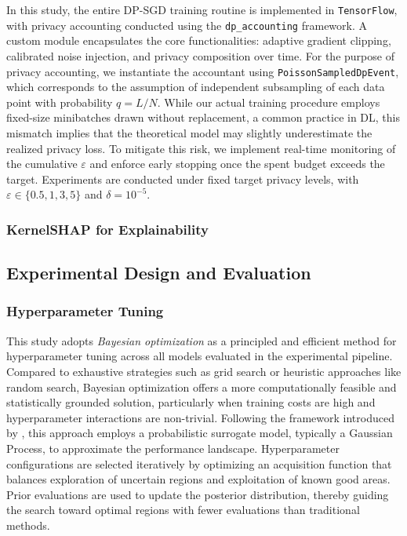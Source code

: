 In this study, the entire DP-SGD training routine is implemented in \texttt{TensorFlow}, with privacy accounting conducted using the \texttt{dp\_accounting} framework. A custom module encapsulates the core functionalities: adaptive gradient clipping, calibrated noise injection, and privacy composition over time. For the purpose of privacy accounting, we instantiate the accountant using \texttt{PoissonSampledDpEvent}, which corresponds to the assumption of independent subsampling of each data point with probability $q = L/N$. While our actual training procedure employs fixed-size minibatches drawn without replacement, a common practice in DL, this mismatch implies that the theoretical model may slightly underestimate the realized privacy loss. To mitigate this risk, we implement real-time monitoring of the cumulative $\varepsilon$ and enforce early stopping once the spent budget exceeds the target. Experiments are conducted under fixed target privacy levels, with \(\varepsilon \in \{0.5, 1, 3, 5\}\) and \(\delta = 10^{-5}\).

\subsubsection{KernelSHAP for Explainability}

\subsection{Experimental Design and Evaluation}

\subsubsection{Hyperparameter Tuning} \label{s:hyper_tune}

This study adopts \textit{Bayesian optimization} as a principled and efficient method for hyperparameter tuning across all models evaluated in the experimental pipeline. Compared to exhaustive strategies such as grid search or heuristic approaches like random search, Bayesian optimization offers a more computationally feasible and statistically grounded solution, particularly when training costs are high and hyperparameter interactions are non-trivial. Following the framework introduced by \cite{wu2019hyperparameter}, this approach employs a probabilistic surrogate model, typically a Gaussian Process, to approximate the performance landscape. Hyperparameter configurations are selected iteratively by optimizing an acquisition function that balances exploration of uncertain regions and exploitation of known good areas. Prior evaluations are used to update the posterior distribution, thereby guiding the search toward optimal regions with fewer evaluations than traditional methods.

